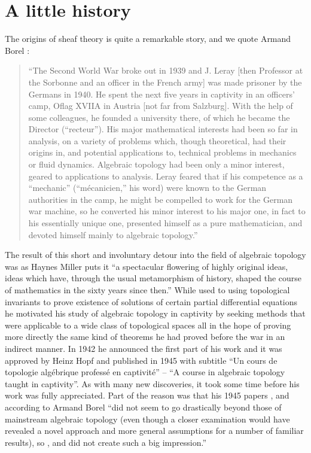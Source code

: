 \documentclass[../../thesis.tex]{subfiles}
\begin{document}
\section{A little history}
The origins of sheaf theory is quite a remarkable story, and we quote Armand Borel \cite{Borel}:
\begin{quotation}
    ``The Second World War broke out in 1939 and J. Leray [then Professor at the Sorbonne and an officer in the French army] was made prisoner by the Germans in 1940.
    He spent the next five years in captivity in an officers’ camp, Oflag XVIIA in Austria [not far from Salzburg].
    With the help of some colleagues, he founded a university there, of which he became the Director (“recteur”).
    His major mathematical interests had been so far in analysis, on a variety of problems which, though theoretical, had their origins in, and potential applications to, technical problems in mechanics or fluid dynamics.
    Algebraic topology had been only a minor interest, geared to applications to analysis. Leray feared that if his competence as a “mechanic” (“mécanicien,” his word) were known to the German authorities in the camp, he might be compelled to work for the German war machine, so he converted his minor interest to his major one, in fact to his essentially unique one, presented himself as a pure mathematician, and devoted himself mainly to algebraic topology.''
\end{quotation}
The result of this short and involuntary detour into the field of algebraic topology was as Haynes Miller \cite{H.Miller} puts it ``a spectacular flowering of highly original ideas, ideas which have, through the usual metamorphism of history, shaped the course of mathematics in the sixty years since then.''
While used to using topological invariants to prove existence of solutions of certain partial differential equations he motivated his study of algebraic topology in captivity by seeking methods that were applicable to a wide class of topological spaces all in the hope of proving more directly the same kind of theorems he had proved before the war in an indirect manner.
In 1942 he announced the first part of his work and it was approved by Heinz Hopf and published in 1945 with subtitle ``Un cours de topologie algébrique professé en captivité'' -- ``A course in algebraic topology taught in captivity''.
As with many new discoveries, it took some time before his work was fully appreciated.
Part of the reason was that his 1945 papers \cite{Leray45a2},\cite{Leray45b2} and \cite{Leray45c2} according to Armand Borel \cite{BorelAMS} ``did not seem to go drastically beyond those of mainstream algebraic topology (even though a closer examination would have revealed a novel approach and more general assumptions for a number of familiar results), so \cite{Leray45a2},\cite{Leray45b2} and \cite{Leray45c2} did not create such a big impression.''
\end{document}
